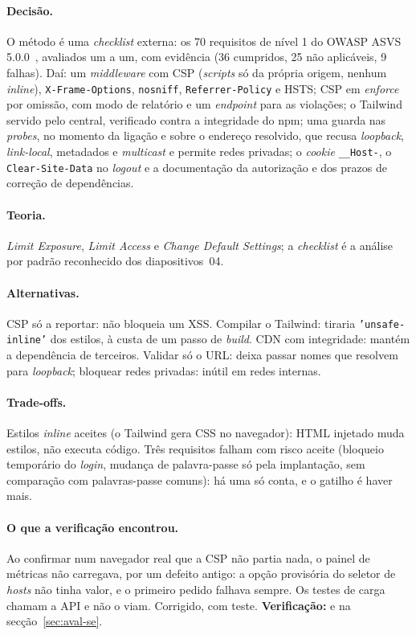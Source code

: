 \paragraph{Decisão.}
O método é uma \emph{checklist} externa: os 70 requisitos de nível 1 do OWASP ASVS 5.0.0~\cite{owaspasvs5},
avaliados um a um, com evidência (36 cumpridos, 25 não aplicáveis, 9 falhas). Daí: um \emph{middleware} com CSP
(\emph{scripts} só da própria origem, nenhum \emph{inline}), \texttt{X-Frame-Options}, \texttt{nosniff},
\texttt{Referrer-Policy} e HSTS; CSP em \emph{enforce} por omissão, com modo de relatório e um \emph{endpoint} para
as violações; o Tailwind servido pelo central, verificado contra a integridade do npm; uma guarda nas \emph{probes},
no momento da ligação e sobre o endereço resolvido, que recusa \emph{loopback}, \emph{link-local}, metadados e
\emph{multicast} e permite redes privadas; o \emph{cookie} \texttt{\_\_Host-}, o \texttt{Clear-Site-Data} no
\emph{logout} e a documentação da autorização e dos prazos de correção de dependências.

\paragraph{Teoria.}
\emph{Limit Exposure}, \emph{Limit Access} e \emph{Change Default Settings}; a \emph{checklist} é a análise por
padrão reconhecido dos diapositivos~04.

\paragraph{Alternativas.}
CSP só a reportar: não bloqueia um XSS. Compilar o Tailwind: tiraria \texttt{'unsafe-inline'} dos estilos, à custa
de um passo de \emph{build}. CDN com integridade: mantém a dependência de terceiros. Validar só o URL: deixa passar
nomes que resolvem para \emph{loopback}; bloquear redes privadas: inútil em redes internas.

\paragraph{Trade-offs.}
Estilos \emph{inline} aceites (o Tailwind gera CSS no navegador): HTML injetado muda estilos, não executa código.
Três requisitos falham com risco aceite (bloqueio temporário do \emph{login}, mudança de palavra-passe só pela
implantação, sem comparação com palavras-passe comuns): há uma só conta, e o gatilho é haver mais.

\paragraph{O que a verificação encontrou.}
Ao confirmar num navegador real que a CSP não partia nada, o painel de métricas não carregava, por um defeito
antigo: a opção provisória do seletor de \emph{hosts} não tinha valor, e o primeiro pedido falhava sempre. Os testes
de carga chamam a API e não o viam. Corrigido, com teste. \textbf{Verificação:}  e  na
secção~\ref{sec:aval-se}.

